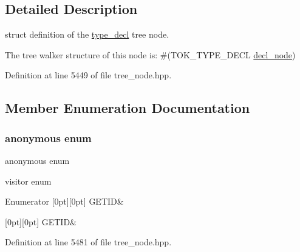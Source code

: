 \subsection{Detailed Description}
struct definition of the \hyperlink{structtype__decl}{type\+\_\+decl} tree node. 

The tree walker structure of this node is\+: \#(T\+O\+K\+\_\+\+T\+Y\+P\+E\+\_\+\+D\+E\+CL \hyperlink{structdecl__node}{decl\+\_\+node}) 

Definition at line 5449 of file tree\+\_\+node.\+hpp.



\subsection{Member Enumeration Documentation}
\mbox{\label{structtype__decl_a78539c8c823f3a6c8849d459da77024b}} 
\subsubsection{\texorpdfstring{anonymous enum}{anonymous enum}}
{\footnotesize\ttfamily anonymous enum}



visitor enum 

\begin{DoxyEnumFields}{Enumerator}
[0pt][0pt]{}\mbox{\label{structtype__decl_a78539c8c823f3a6c8849d459da77024babc93e770294b80c9d5c835a9fa822bb9}} 
G\+E\+T\+ID&\\
\hline

[0pt][0pt]{}\mbox{\label{structtype__decl_a78539c8c823f3a6c8849d459da77024babc93e770294b80c9d5c835a9fa822bb9}} 
G\+E\+T\+ID&\\
\hline

\end{DoxyEnumFields}


Definition at line 5481 of file tree\+\_\+node.\+hpp.



